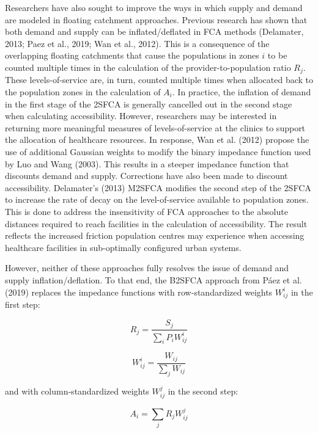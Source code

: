 \documentclass[]{elsarticle} %
\begin{document}
Researchers have also sought to improve the ways in which supply and
demand are modeled in floating catchment approaches. Previous research
has shown that both demand and supply can be inflated/deflated in FCA
methods (Delamater, 2013; Paez et al., 2019; Wan et al., 2012). This is
a consequence of the overlapping floating catchments that cause the
populations in zones \(i\) to be counted multiple times in the
calculation of the provider-to-population ratio \(R_j\). These
levels-of-service are, in turn, counted multiple times when allocated
back to the population zones in the calculation of \(A_i\). In practice,
the inflation of demand in the first stage of the 2SFCA is generally
cancelled out in the second stage when calculating accessibility.
However, researchers may be interested in returning more meaningful
measures of levels-of-service at the clinics to support the allocation
of healthcare resources. In response, Wan et al. (2012) propose the use
of additional Gaussian weights to modify the binary impedance function
used by Luo and Wang (2003). This results in a steeper impedance
function that discounts demand and supply. Corrections have also been
made to discount accessibility. Delamater's (2013) M2SFCA modifies the
second step of the 2SFCA to increase the rate of decay on the
level-of-service available to population zones. This is done to address
the insensitivity of FCA approaches to the absolute distances required
to reach facilities in the calculation of accessibility. The result
reflects the increased friction population centres may experience when
accessing healthcare facilities in sub-optimally configured urban
systems.

However, neither of these approaches fully resolves the issue of demand
and supply inflation/deflation. To that end, the B2SFCA approach from
Páez et al. (2019) replaces the impedance functions with
row-standardized weights \(W_{ij}^{i}\) in the first step:

\begin{equation}
\label{eq:bfca_R_j}
R_j = \frac{S_j}{\sum_i{P_iW_{ij}^{i}}}
\end{equation}

\begin{equation}
\label{eq:bfca_W_ij_i}
W_{ij}^{i} = \frac{W_{ij}}{\sum_j W_{ij}}
\end{equation}

\noindent and with column-standardized weights \(W_{ij}^{j}\) in the
second step:

\begin{equation}
\label{eq:bfca_A_i}
A_i = \sum_j{R_jW_{ij}^{j}}
\end{equation}
\end{document}
